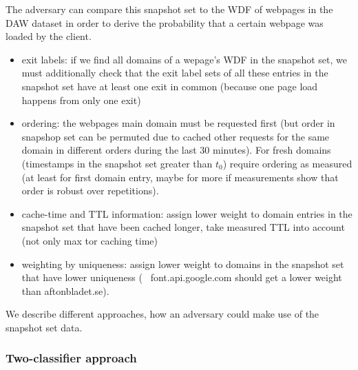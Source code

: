 The adversary can compare this snapshot set to the WDF of webpages in
the DAW dataset in order to derive the probability that a certain
webpage was loaded by the client.

\begin{itemize}
  \item exit labels: if we find all domains of a wepage's WDF in the
		  snapshot set, we must additionally check that the exit label
		  sets of all these entries in the snapshot set have at least
		  one exit in common (because one page load happens from only
		  one exit)
  \item ordering: the webpages main domain must be requested first (but
		  order in snapshop set can be permuted due to cached other
		  requests for the same domain in different orders during the
		  last 30 minutes). For fresh domains (timestamps in the
		  snapshot set greater than $t_0$) require ordering as measured
		  (at least for first domain entry, maybe for more if
		  measurements show that order is robust over repetitions).
  \item cache-time and TTL information: assign lower weight to domain
		  entries in the snapshot set that have been cached longer, take
		  measured TTL into account (not only max tor caching time)
  \item weighting by uniqueness: assign lower weight to domains in the
		  snapshot set that have lower uniqueness (\eg~
		  font.api.google.com should get a lower weight than
		  aftonbladet.se).
\end{itemize}

We describe different approaches, how an adversary could make use of the
snapshot set data.

\subsubsection{Two-classifier approach}

